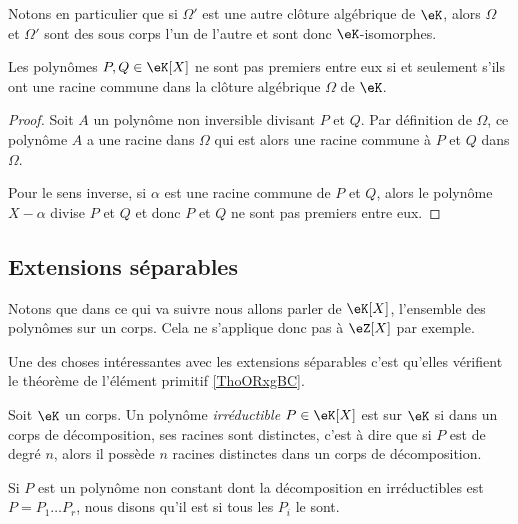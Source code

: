 Notons en particulier que si \( \Omega'\) est une autre clôture algébrique de \( \eK\), alors \( \Omega\) et \( \Omega'\) sont des sous corps l'un de l'autre et sont donc \( \eK\)-isomorphes.

\begin{lemma}
    Les polynômes \( P,Q\in \eK[X]\) ne sont pas premiers entre eux si et seulement s'ils ont une racine commune dans la clôture algébrique \( \Omega\) de \( \eK\).
\end{lemma}

\begin{proof}
    Soit \( A\) un polynôme non inversible divisant \( P\) et $Q$. Par définition de \( \Omega\), ce polynôme \( A\) a une racine dans \( \Omega\) qui est alors une racine commune à \( P\) et \( Q\) dans \( \Omega\).

    Pour le sens inverse, si \( \alpha\) est une racine commune de \( P\) et \( Q\), alors le polynôme \( X-\alpha\) divise \( P\) et \( Q\) et donc \( P\) et \( Q \) ne sont pas premiers entre eux.
\end{proof}


\subsection{Extensions séparables}

Notons que dans ce qui va suivre nous allons parler de \( \eK[X]\), l'ensemble des polynômes sur un corps. Cela ne s'applique donc pas à \( \eZ[X]\) par exemple.

Une des choses intéressantes avec les extensions séparables c'est qu'elles vérifient le théorème de l'élément primitif \ref{ThoORxgBC}.

\begin{definition}      \label{DEFooLXSBooCHIUFU}
    Soit \( \eK\) un corps. Un polynôme \emph{irréductible} \( P\in \eK[X]\) est  sur $\eK$ si dans un corps de décomposition, ses racines sont distinctes, c'est à dire que si \( P\) est de degré \( n\), alors il possède \( n\) racines distinctes dans un corps de décomposition.

    Si \( P\) est un polynôme non constant dont la décomposition en irréductibles est \( P=P_1\ldots P_r\), nous disons qu'il est  si tous les \( P_i\) le sont.
\end{definition}

